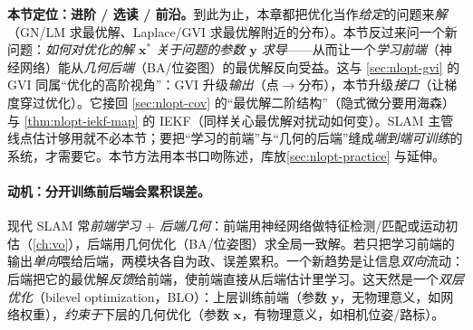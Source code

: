 \begin{note}
\textbf{本节定位：进阶 / 选读 / 前沿。}\;到此为止，本章都把优化当作\emph{给定}的问题来\emph{解}（GN/LM 求最优解、Laplace/GVI 求最优解附近的分布）。本节反过来问一个新问题：\emph{如何对优化的解 $\mathbf{x}^*$ 关于问题的参数 $\mathbf{y}$ 求导}——从而让一个\emph{学习前端}（神经网络）能从\emph{几何后端}（BA/位姿图）的最优解反向受益。这与 \cref{sec:nlopt-gvi} 的 GVI 同属“优化的高阶视角”：GVI 升级\emph{输出}（点$\to$分布），本节升级\emph{接口}（让梯度穿过优化）。它接回 \cref{sec:nlopt-cov} 的“最优解二阶结构”（隐式微分要用海森）与 \cref{thm:nlopt-iekf-map} 的 IEKF（同样关心最优解对扰动如何变）。SLAM 主管线点估计够用就不必本节；要把“学习的前端”与“几何的后端”缝成\emph{端到端可训练}的系统，才需要它。本节方法用本书口吻陈述，库放\cref{sec:nlopt-practice} 与延伸。
\end{note}

\paragraph{动机：分开训练前后端会累积误差。}\cite{carlone2026handbook}
现代 SLAM 常\emph{前端学习 $+$ 后端几何}：前端用神经网络做特征检测/匹配或运动初估（\cref{ch:vo}），后端用几何优化（BA/位姿图）求全局一致解。若只把学习前端的输出\emph{单向}喂给后端，两模块各自为政、误差累积。一个新趋势是让信息\emph{双向}流动：后端把它的最优解\emph{反馈}给前端，使前端直接从后端估计里学习。这天然是一个\emph{双层优化}（bilevel optimization，BLO）：上层训练前端（参数 $\mathbf{y}$，无物理意义，如网络权重），\emph{约束于}下层的几何优化（参数 $\mathbf{x}$，有物理意义，如相机位姿/路标）。

